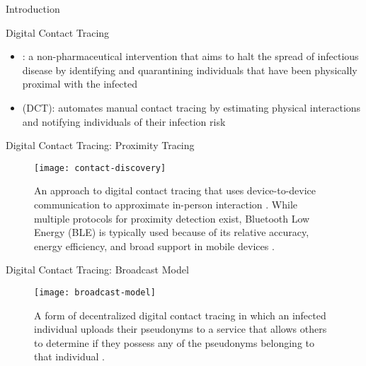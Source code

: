 \documentclass[11pt]{beamer}
\begin{document}
\begin{frame}
	\maketitle
\end{frame}

\begin{section}{Introduction}

\begin{frame}{Digital Contact Tracing}
\begin{itemize}
  \item {}: a non-pharmaceutical intervention that aims to halt the spread of infectious disease by identifying and quarantining individuals that have been physically proximal with the infected \citep{PozoMartin2023}
  \pause
  \item {} (DCT): automates manual contact tracing by estimating physical interactions and notifying individuals of their infection risk \citep{Reichert2021}
\end{itemize}
\end{frame}

\begin{frame}{Digital Contact Tracing: Proximity Tracing}
\begin{figure}
  \centering
  \texttt{[image: contact-discovery]}
  \caption[Proximity tracing]{An approach to digital contact tracing that uses device-to-device communication to approximate in-person interaction \cite{Reichert2021}. While multiple protocols for proximity detection exist, Bluetooth Low Energy (BLE) is typically used because of its relative accuracy, energy efficiency, and broad support in mobile devices \citep{Shubina2020, Reichert2021}.}
\end{figure}
\end{frame}

\begin{frame}{Digital Contact Tracing: Broadcast Model}
\begin{figure}
  \centering
  \texttt{[image: broadcast-model]}
  \caption[Broadcast model]{A form of decentralized digital contact tracing in which an infected individual uploads their pseudonyms to a service that allows others to determine if they possess any of the pseudonyms belonging to that individual \cite{Reichert2021}.}
\end{figure}
\end{frame}


\end{section}
\end{document}
